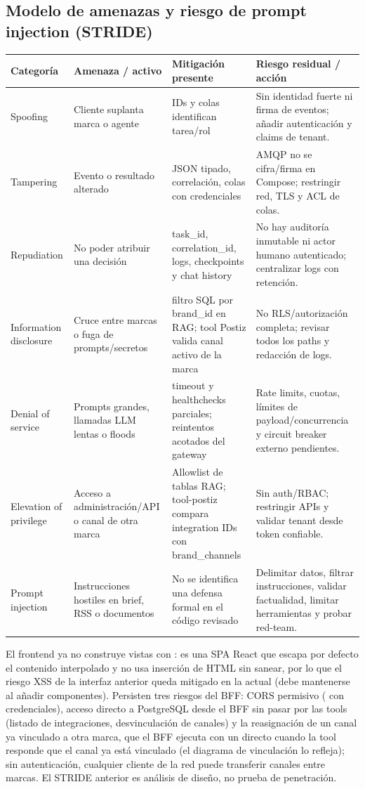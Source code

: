 \documentclass[12pt,oneside]{report}
\newcommand{\code}[1]{\texttt{\detokenize{#1}}}
\begin{document}
\subsection{Modelo de amenazas y riesgo de prompt injection (STRIDE)}
\begin{longtable}{p{1.5cm}p{4.1cm}p{4.0cm}p{4.7cm}}
\toprule
Categoría & Amenaza / activo & Mitigación presente & Riesgo residual / acción \\
\midrule
Spoofing & Cliente suplanta marca o agente & IDs y colas identifican tarea/rol & Sin identidad fuerte ni firma de eventos; añadir autenticación y claims de tenant. \\
Tampering & Evento o resultado alterado & JSON tipado, correlación, colas con credenciales & AMQP no se cifra/firma en Compose; restringir red, TLS y ACL de colas. \\
Repudiation & No poder atribuir una decisión & task\_id, correlation\_id, logs, checkpoints y chat history & No hay auditoría inmutable ni actor humano autenticado; centralizar logs con retención. \\
Information disclosure & Cruce entre marcas o fuga de prompts/secretos & filtro SQL por brand\_id en RAG; tool Postiz valida canal activo de la marca & No RLS/autorización completa; revisar todos los paths y redacción de logs. \\
Denial of service & Prompts grandes, llamadas LLM lentas o floods & timeout y healthchecks parciales; reintentos acotados del gateway & Rate limits, cuotas, límites de payload/concurrencia y circuit breaker externo pendientes. \\
Elevation of privilege & Acceso a administración/API o canal de otra marca & Allowlist de tablas RAG; tool-postiz compara integration IDs con brand\_channels & Sin auth/RBAC; restringir APIs y validar tenant desde token confiable. \\
Prompt injection & Instrucciones hostiles en brief, RSS o documentos & No se identifica una defensa formal en el código revisado & Delimitar datos, filtrar instrucciones, validar factualidad, limitar herramientas y probar red-team. \\
\bottomrule
\end{longtable}

El frontend ya no construye vistas con \code{innerHTML}: es una SPA React que escapa por defecto el contenido interpolado y no usa inserción de HTML sin sanear, por lo que el riesgo XSS de la interfaz anterior queda mitigado en la actual (debe mantenerse al añadir componentes). Persisten tres riesgos del BFF: CORS permisivo (\code{allow_origins=*} con credenciales), acceso directo a PostgreSQL desde el BFF sin pasar por las tools (listado de integraciones, desvinculación de canales) y la reasignación de un canal ya vinculado a otra marca, que el BFF ejecuta con un \code{UPDATE} directo cuando la tool responde que el canal ya está vinculado (el diagrama de vinculación lo refleja); sin autenticación, cualquier cliente de la red puede transferir canales entre marcas. El STRIDE anterior es análisis de diseño, no prueba de penetración.
\end{document}
